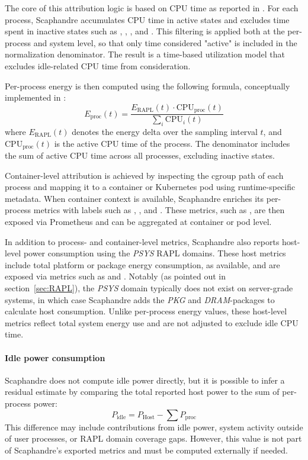 The core of this attribution logic is based on CPU time as reported in . For each process, Scaphandre accumulates CPU time in active states and excludes time spent in inactive states such as , , , and . This filtering is applied both at the per-process and system level, so that only time considered "active" is included in the normalization denominator. The result is a time-based utilization model that excludes idle-related CPU time from consideration.

Per-process energy is then computed using the following formula, conceptually implemented in :
\begin{equation}
E_{\text{proc}}(t) = \frac{E_{\text{RAPL}}(t) \cdot \text{CPU}_{\text{proc}}(t)}{\sum_i \text{CPU}_i(t)}
\end{equation}
where \( E_{\text{RAPL}}(t) \) denotes the energy delta over the sampling interval \( t \), and \( \text{CPU}_{\text{proc}}(t) \) is the active CPU time of the process. The denominator includes the sum of active CPU time across all processes, excluding inactive states.

Container-level attribution is achieved by inspecting the cgroup path of each process and mapping it to a container or Kubernetes pod using runtime-specific metadata. When container context is available, Scaphandre enriches its per-process metrics with labels such as , , and . These metrics, such as , are then exposed via Prometheus and can be aggregated at container or pod level.

In addition to process- and container-level metrics, Scaphandre also reports host-level power consumption using the \textit{PSYS} RAPL domains. These host metrics include total platform or package energy consumption, as available, and are exposed via metrics such as  and . Notably (as pointed out in section~\ref{sec:RAPL}), the \textit{PSYS} domain typically does not exist on server-grade systems, in which case Scaphandre adds the \textit{PKG} and \textit{DRAM}-packages to calculate host consumption. Unlike per-process energy values, these host-level metrics reflect total system energy use and are not adjusted to exclude idle CPU time.

\paragraph{Idle power consumption}
Scaphandre does not compute idle power directly, but it is possible to infer a residual estimate by comparing the total reported host power to the sum of per-process power:
\[
P_{\text{idle}} = P_{\text{Host}} - \sum P_{\text{proc}}
\]
This difference may include contributions from idle power, system activity outside of user processes, or RAPL domain coverage gaps. However, this value is not part of Scaphandre’s exported metrics and must be computed externally if needed.

